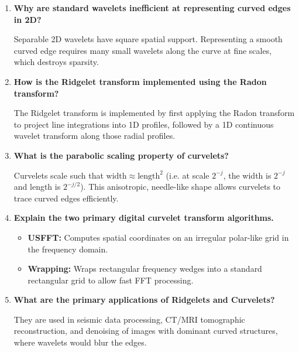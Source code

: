 \documentclass[12pt,a4paper]{article}
\newcommand{\Q}[1]{\textbf{#1}\par\noindent\ignorespaces}
\begin{document}
\begin{tcolorbox}[exambox, title={\textbf{Frequently Asked / Viva Questions}}]
\begin{enumerate}[topsep=0pt, label=\textbf{Q\arabic*.}, itemsep=5pt]
  \item \Q{Why are standard wavelets inefficient at representing curved edges in 2D?}
        Separable 2D wavelets have square spatial support. Representing a smooth curved edge requires many small wavelets along the curve at fine scales, which destroys sparsity.

  \item \Q{How is the Ridgelet transform implemented using the Radon transform?}
        The Ridgelet transform is implemented by first applying the Radon transform to project line integrations into 1D profiles, followed by a 1D continuous wavelet transform along those radial profiles.

  \item \Q{What is the parabolic scaling property of curvelets?}
        Curvelets scale such that $\text{width} \approx \text{length}^2$ (i.e. at scale $2^{-j}$, the width is $2^{-j}$ and length is $2^{-j/2}$). This anisotropic, needle-like shape allows curvelets to trace curved edges efficiently.

  \item \Q{Explain the two primary digital curvelet transform algorithms.}
        \begin{itemize}[leftmargin=*, itemsep=1pt, topsep=2pt]
          \item \textbf{USFFT:} Computes spatial coordinates on an irregular polar-like grid in the frequency domain.
          \item \textbf{Wrapping:} Wraps rectangular frequency wedges into a standard rectangular grid to allow fast FFT processing.
        \end{itemize}

  \item \Q{What are the primary applications of Ridgelets and Curvelets?}
        They are used in seismic data processing, CT/MRI tomographic reconstruction, and denoising of images with dominant curved structures, where wavelets would blur the edges.
\end{enumerate}
\end{tcolorbox}
\end{document}
